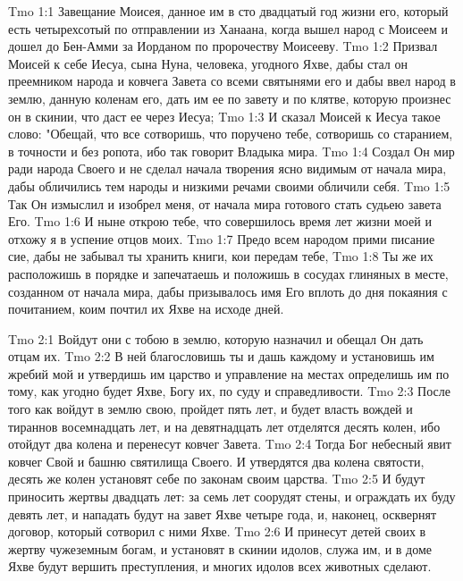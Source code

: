 \vs Tmo 1:1
Завещание Моисея, данное им в сто двадцатый год жизни его, который есть четырехсотый по отправлении из Ханаана, когда вышел народ с Моисеем и дошел до Бен-Амми за Иорданом по пророчеству Моисееву.
\vs Tmo 1:2
Призвал Моисей к себе Иесуа, сына Нуна, человека, угодного Яхве, дабы стал он преемником народа и ковчега Завета со всеми святынями его и дабы ввел народ в землю, данную коленам его, дать им ее по завету и по клятве, которую произнес он в скинии, что даст ее через Иесуа;
\vs Tmo 1:3
И сказал Моисей к Иесуа такое слово: "Обещай, что все сотворишь, что поручено тебе, сотворишь со старанием, в точности и без ропота, ибо так говорит Владыка мира.
\vs Tmo 1:4
Создал Он мир ради народа Своего и не сделал начала творения ясно видимым от начала мира, дабы обличились тем народы и низкими речами своими обличили себя.
\vs Tmo 1:5
Так Он измыслил и изобрел меня, от начала мира готового стать судьею завета Его.
\vs Tmo 1:6
И ныне открою тебе, что совершилось время лет жизни моей и отхожу я в успение отцов моих.
\vs Tmo 1:7
Предо всем народом прими писание сие, дабы не забывал ты хранить книги, кои передам тебе,
\vs Tmo 1:8
Ты же их расположишь в порядке и запечатаешь и положишь в сосудах глиняных в месте, созданном от начала мира, дабы призывалось имя Его вплоть до дня покаяния с почитанием, коим почтил их Яхве на исходе дней.

\vs Tmo 2:1
Войдут они с тобою в землю, которую назначил и обещал Он дать отцам их.
\vs Tmo 2:2
В ней благословишь ты и дашь каждому и установишь им жребий мой и утвердишь им царство и управление на местах определишь им по тому, как угодно будет Яхве, Богу их, по суду и справедливости.
\vs Tmo 2:3
После того как войдут в землю свою, пройдет пять лет, и будет власть вождей и тираннов восемнадцать лет, и на девятнадцать лет отделятся десять колен, ибо отойдут два колена и перенесут ковчег Завета.
\vs Tmo 2:4
Тогда Бог небесный явит ковчег Свой и башню святилища Своего. И утвердятся два колена святости, десять же колен установят себе по законам своим царства.
\vs Tmo 2:5
И будут приносить жертвы двадцать лет: за семь лет соорудят стены, и ограждать их буду девять лет, и нападать будут на завет Яхве четыре года, и, наконец, осквернят договор, который сотворил с ними Яхве.
\vs Tmo 2:6
И принесут детей своих в жертву чужеземным богам, и установят в скинии идолов, служа им, и в доме Яхве будут вершить преступления, и многих идолов всех животных сделают.

